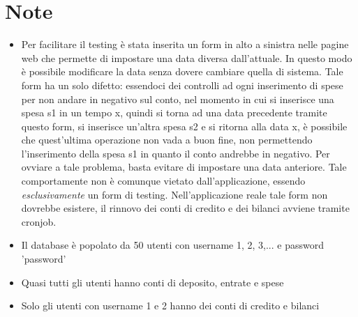 \documentclass[a4paper,10pt]{article}
\begin{document}
\section{Note}
\begin{itemize}
\item Per facilitare il testing è stata inserita un form in alto a sinistra nelle pagine web che permette di impostare una data diversa dall'attuale. In questo modo è possibile modificare la data senza dovere cambiare quella di sistema. Tale form ha un solo difetto: essendoci dei controlli ad ogni inserimento di spese per non andare in negativo sul conto, nel momento in cui si inserisce una spesa s1 in un tempo x, quindi si torna ad una data precedente tramite questo form, si inserisce un'altra spesa s2 e si ritorna alla data x, è possibile che quest'ultima operazione non vada a buon fine, non permettendo l'inserimento della spesa s1 in quanto il conto andrebbe in negativo. Per ovviare a tale problema, basta evitare di impostare una data anteriore. Tale comportamente non è comunque vietato dall'applicazione, essendo \emph{esclusivamente} un form di testing. Nell'applicazione reale tale form non dovrebbe esistere, il rinnovo dei conti di credito e dei bilanci avviene tramite cronjob.
\item Il database è popolato da 50 utenti con username 1, 2, 3,... e password 'password'
\item Quasi tutti gli utenti hanno conti di deposito, entrate e spese
\item Solo gli utenti con username 1 e 2 hanno dei conti di credito e bilanci


\end{itemize}
\end{document}
